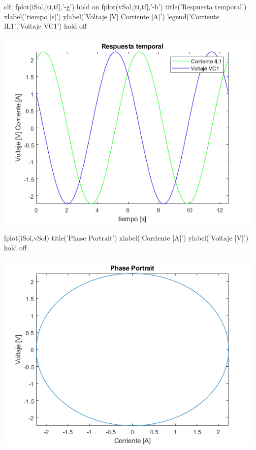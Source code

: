\documentclass[10pt,a4paper]{article} %
\begin{document}
	
	\begin{matlabcode}
		clf;
		fplot(iSol,[ti,tf],'-g')
		hold on
		fplot(vSol,[ti,tf],'-b')
		title('Respuesta temporal')
		xlabel('tiempo [s]')
		ylabel('Voltaje [V] Corriente [A]')
		legend({'Corriente IL1','Voltaje VC1'})
		hold off
	\end{matlabcode}
	\begin{center}
		\includegraphics[width=\maxwidth{56.196688409433015em}]{figure_0_00}
	\end{center}
	
	
	\begin{matlabcode}
		fplot(iSol,vSol)
		title('Phase Portrait')
		xlabel('Corriente [A]')
		ylabel('Voltaje [V]')
		hold off
	\end{matlabcode}
	\begin{center}
		\includegraphics[width=\maxwidth{56.196688409433015em}]{figure_1_00}
	\end{center}
	
\end{document}
